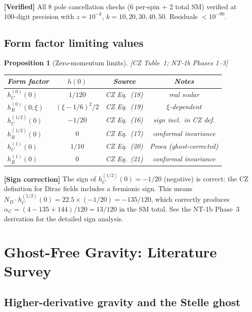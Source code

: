 \documentclass[12pt,a4paper]{article}
\newtheorem{proposition}{Proposition}[section]
\theoremstyle{definition}
\theoremstyle{remark}
\newcommand{\fromlit}[1]{\textcolor{blue!70!black}{\textsf{[#1]}}}
\newcommand{\verified}[1]{%
  \par\smallskip\noindent
  \colorbox{green!10}{\parbox{\dimexpr\linewidth-2\fboxsep}{%
    \textcolor{green!50!black}{\textbf{[Verified]}} #1}}%
  \par\smallskip}
\newcommand{\signcorrection}[1]{%
  \par\noindent\colorbox{red!10}{%
    \parbox{\dimexpr\linewidth-2\fboxsep}{%
      \textcolor{red!50!black}{\textbf{[Sign correction]}}
      \textcolor{red!50!black}{#1}%
    }%
  }\par%
}
\begin{document}
\verified{All 8 pole cancellation checks (6 per-spin + 2 total SM)
verified at 100-digit precision with $z = 10^{-k}$,
$k = 10, 20, 30, 40, 50$.  Residuals $< 10^{-90}$.}


\subsection{Form factor limiting values}

\begin{proposition}[Zero-momentum limits]
\label{prop:limits}
\fromlit{CZ Table~1; NT-1b Phases 1--3}
\begin{center}
\begin{tabular}{lccc}
\toprule
Form factor & $h(0)$ & Source & Notes \\
\midrule
$h_C^{(0)}(0)$ & $1/120$ & CZ Eq.~(18) & real scalar \\
$h_R^{(0)}(0;\xi)$ & $(\xi-1/6)^2/2$ & CZ Eq.~(19) & $\xi$-dependent \\
$h_C^{(1/2)}(0)$ & $-1/20$ & CZ Eq.~(16) & sign incl.\ in CZ def. \\
$h_R^{(1/2)}(0)$ & $0$ & CZ Eq.~(17) & conformal invariance \\
$h_C^{(1)}(0)$ & $1/10$ & CZ Eq.~(20) & Proca (ghost-corrected) \\
$h_R^{(1)}(0)$ & $0$ & CZ Eq.~(21) & conformal invariance \\
\bottomrule
\end{tabular}
\end{center}
\end{proposition}

\signcorrection{The sign of $h_C^{(1/2)}(0) = -1/20$ (negative) is
correct: the CZ definition for Dirac fields includes a fermionic
sign.  This means $N_D \cdot h_C^{(1/2)}(0) = 22.5 \times (-1/20)
= -135/120$, which correctly produces $\alpha_C = (4 - 135 + 144)/120
= 13/120$ in the SM total.  See the NT-1b Phase~3 derivation for the detailed
sign analysis.}


\section{Ghost-Free Gravity: Literature Survey}
\label{sec:ghost-free}

\subsection{Higher-derivative gravity and the Stelle ghost}
\end{document}
